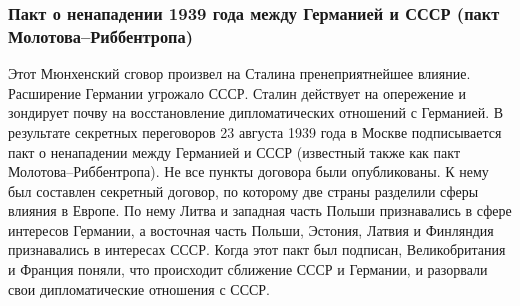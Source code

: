 \subsubsection{\textbf{Пакт о ненападении 1939 года между Германией и СССР (пакт Молотова--Риббентропа)}}

Этот Мюнхенский сговор произвел на Сталина пренеприятнейшее влияние. Расширение Германии угрожало СССР. Сталин действует на опережение и зондирует почву на восстановление дипломатических отношений с Германией. В результате секретных переговоров 23 августа 1939 года в Москве подписывается пакт о ненападении между Германией и СССР (известный также как пакт Молотова--Риббентропа). Не все пункты договора были опубликованы. К нему был составлен секретный договор, по которому две страны разделили сферы влияния в Европе. По нему Литва и западная часть Польши признавались в сфере интересов Германии, а восточная часть Польши, Эстония, Латвия и Финляндия признавались в интересах СССР. Когда этот пакт был подписан, Великобритания и Франция поняли, что происходит сближение СССР и Германии, и разорвали свои дипломатические отношения с СССР.

